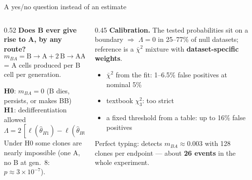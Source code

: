 \documentclass[aspectratio=169,11pt]{beamer}
\newcommand{\take}[1]{\begin{block}{}\small #1\end{block}}
\begin{document}
\begin{frame}{A yes/no question instead of an estimate}
\begin{columns}[T]
\begin{column}{0.52\textwidth}
\textbf{Does B ever give rise to A, by any route?}
\[ m_{BA} = \text{B}{\to}\text{A} + 2\,\text{B}{\to}\text{AA} + \text{B}{\to}\text{AB} \]
= A cells produced per B cell per generation.

\medskip
\textbf{H0}: $m_{BA}=0$ (B dies, persists, or makes BB)\\
\textbf{H1}: dedifferentiation allowed
\[ \Lambda = 2\,[\ell(\hat\theta_{H1}) - \ell(\hat\theta_{H0})] \]
Under H0 some clones are nearly impossible (one A, no B at gen.\ 8: $p \approx 3\times10^{-7}$).
\end{column}
\begin{column}{0.45\textwidth}\small
\textbf{Calibration.} The tested probabilities sit on a boundary $\Rightarrow$ $\Lambda = 0$ in 25--77\% of null datasets; reference is a $\bar\chi^2$ mixture with \textbf{dataset-specific weights}.
\begin{itemize}
\item $\bar\chi^2$ from the fit: 1--6.5\% false positives at nominal 5\%
\item textbook $\chi^2_3$: too strict
\item a fixed threshold from a table: up to 16\% false positives
\end{itemize}
\take{Perfect typing: detects $m_{BA}\approx 0.003$ with 128 clones per endpoint --- about \textbf{26 events} in the whole experiment.}
\end{column}
\end{columns}
\end{frame}
\end{document}
